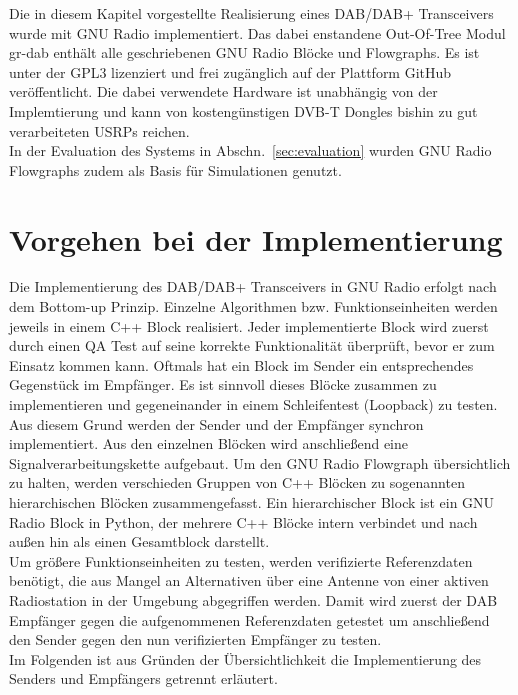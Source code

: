 Die in diesem Kapitel vorgestellte Realisierung eines DAB/DAB+ Transceivers wurde mit GNU Radio implementiert. Das dabei enstandene Out-Of-Tree Modul gr-dab enthält alle geschriebenen GNU Radio Blöcke und Flowgraphs. Es ist unter der \ac{GPL3} lizenziert und frei zugänglich auf der Plattform GitHub~\cite{repo:gr-dab} veröffentlicht. Die dabei verwendete Hardware ist unabhängig von der Implemtierung und kann von kostengünstigen DVB-T Dongles bishin zu gut verarbeiteten \acp{USRP} reichen.\\
In der Evaluation des Systems in Abschn.~\ref{sec:evaluation} wurden GNU Radio Flowgraphs zudem als Basis für Simulationen genutzt.

\section{Vorgehen bei der Implementierung}
Die Implementierung des DAB/DAB+ Transceivers in GNU Radio erfolgt nach dem Bottom-up Prinzip. Einzelne Algorithmen bzw. Funktionseinheiten werden jeweils in einem C++ Block realisiert. Jeder implementierte Block wird zuerst durch einen \ac{QA} Test auf seine korrekte Funktionalität überprüft, bevor er zum Einsatz kommen kann. Oftmals hat ein Block im Sender ein entsprechendes Gegenstück im Empfänger. Es ist sinnvoll dieses Blöcke zusammen zu implementieren und gegeneinander in einem Schleifentest (Loopback) zu testen. Aus diesem Grund werden der Sender und der Empfänger synchron implementiert. Aus den einzelnen Blöcken wird anschließend eine Signalverarbeitungskette aufgebaut. Um den GNU Radio Flowgraph übersichtlich zu halten, werden verschieden Gruppen von C++ Blöcken zu sogenannten hierarchischen Blöcken zusammengefasst. Ein hierarchischer Block ist ein GNU Radio Block in Python, der mehrere C++ Blöcke intern verbindet und nach außen hin als einen Gesamtblock darstellt.\\
Um größere Funktionseinheiten zu testen, werden verifizierte Referenzdaten benötigt, die aus Mangel an Alternativen über eine Antenne von einer aktiven Radiostation in der Umgebung abgegriffen werden. Damit wird zuerst der DAB Empfänger gegen die aufgenommenen Referenzdaten getestet um anschließend den Sender gegen den nun verifizierten Empfänger zu testen.\\
Im Folgenden ist aus Gründen der Übersichtlichkeit die Implementierung des Senders und Empfängers getrennt erläutert.